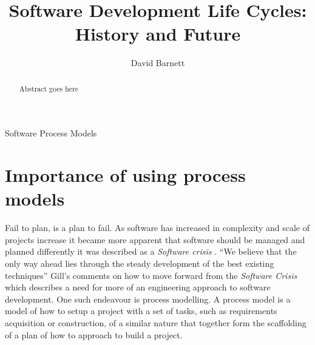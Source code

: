 \documentclass{style/CRPITStyle}
\renewcommand{\cite}{\citep}
\begin{document}
\title{Software Development Life Cycles: History and Future}
\author{David Barnett}

\maketitle

\begin{abstract}
    Abstract goes here
\end{abstract}

\vspace{.1in}

 Software Process Models

\vspace{.1in}


\section{Importance of using process models}

Fail to plan, is a plan to fail. 
As software has increased in complexity and scale of projects increase it
became more apparent that software should be managed and planned differently it was
described as a \emph{Software crisis} \cite{nato:1969}.
``We believe that the only way ahead lies through the steady development of the best existing 
techniques'' \cite{nato:1969} Gill's comments on how to move forward from the
\emph{Software Crisis} which describes a need for more of an engineering approach to software development.
One such endeavour is process modelling.
A process model is a model of how to setup a project with a set of tasks,
such as requirements acquisition or construction, of a similar nature that together form 
the scaffolding of a plan of how to approach to build a project.

\vspace{.1in} %
\end{document}
